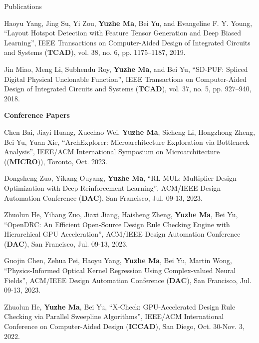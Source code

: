 \begin{rSection}{Publications}
\begin{description}[font=\normalfont]
\item[{[J2]}]{
	Haoyu Yang, Jing Su, Yi Zou, \textbf{Yuzhe Ma}, Bei Yu, and Evangeline F. Y. Young,
	``Layout Hotspot Detection with Feature Tensor Generation and Deep Biased Learning'',
	IEEE Transactions on Computer-Aided Design of Integrated Circuits and Systems (\textbf{TCAD}), vol. 38, no. 6, pp. 1175--1187, 2019.
}

\item[{[J1]}]{
	Jin Miao, Meng Li, Subhendu Roy, \textbf{Yuzhe Ma}, and Bei Yu,
	``SD-PUF: Spliced Digital Physical Unclonable Function'',
	IEEE Transactions on Computer-Aided Design of Integrated Circuits and Systems (\textbf{TCAD}), vol. 37, no. 5, pp. 927--940, 2018.
}
\end{description}


\textbf{Conference Papers}
\begin{description}[font=\normalfont]
\item [{[C31]}]{
    Chen Bai, Jiayi Huang, Xuechao Wei, \textbf{Yuzhe Ma}, Sicheng Li, Hongzhong Zheng, Bei Yu, Yuan Xie,
    ``ArchExplorer: Microarchitecture Exploration via Bottleneck Analysis'', 
    IEEE/ACM International Symposium on Microarchitecture ((\textbf{MICRO})), Toronto, Oct. 2023.
}

\item [{[C30]}]{
    Dongsheng Zuo, Yikang Ouyang, \textbf{Yuzhe Ma},
    ``RL-MUL: Multiplier Design Optimization with Deep Reinforcement Learning'',
    ACM/IEEE Design Automation Conference (\textbf{DAC}), San Francisco, Jul. 09-13, 2023.
}

\item [{[C29]}]{
    Zhuolun He, Yihang Zuo, Jiaxi Jiang, Haisheng Zheng, \textbf{Yuzhe Ma}, Bei Yu,
    ``OpenDRC: An Efficient Open-Source Design Rule Checking Engine with Hierarchical GPU Acceleration'',
    ACM/IEEE Design Automation Conference (\textbf{DAC}), San Francisco, Jul. 09-13, 2023.
}

\item [{[C28]}]{
    Guojin Chen, Zehua Pei, Haoyu Yang, \textbf{Yuzhe Ma}, Bei Yu, Martin Wong,
    ``Physics-Informed Optical Kernel Regression Using Complex-valued Neural Fields'',
    ACM/IEEE Design Automation Conference (\textbf{DAC}), San Francisco, Jul. 09-13, 2023.
}

\item [{[C27]}]{
    Zhuolun He, \textbf{Yuzhe Ma}, Bei Yu,
    ``X-Check: GPU-Accelerated Design Rule Checking via Parallel Sweepline Algorithms'',
    IEEE/ACM International Conference on Computer-Aided Design (\textbf{ICCAD}), San Diego, Oct. 30-Nov. 3, 2022.
}


\end{description}
\end{rSection}
